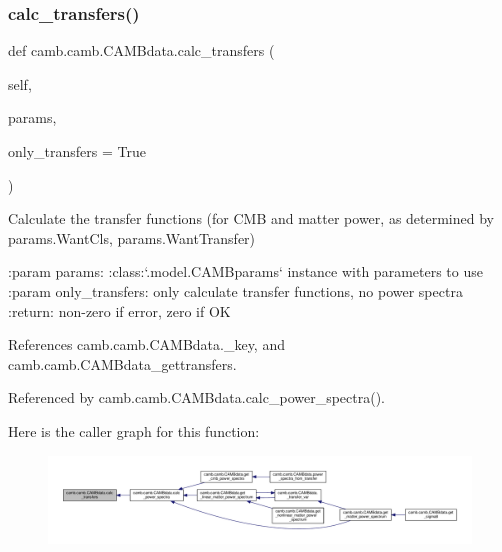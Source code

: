 \subsubsection{\texorpdfstring{calc\+\_\+transfers()}{calc\_transfers()}}
{\footnotesize\ttfamily def camb.\+camb.\+C\+A\+M\+Bdata.\+calc\+\_\+transfers (\begin{DoxyParamCaption}\item[{}]{self,  }\item[{}]{params,  }\item[{}]{only\+\_\+transfers = {\ttfamily True} }\end{DoxyParamCaption})}

\begin{DoxyVerb}Calculate the transfer functions (for CMB and matter power, as determined by params.WantCls, params.WantTransfer)

:param params: :class:`.model.CAMBparams` instance with parameters to use
:param only_transfers: only calculate transfer functions, no power spectra
:return: non-zero if error, zero if OK
\end{DoxyVerb}
 

References camb.\+camb.\+C\+A\+M\+Bdata.\+\_\+key, and camb.\+camb.\+C\+A\+M\+Bdata\+\_\+gettransfers.



Referenced by camb.\+camb.\+C\+A\+M\+Bdata.\+calc\+\_\+power\+\_\+spectra().

Here is the caller graph for this function\+:
\nopagebreak
\begin{figure}[H]
\begin{center}
\leavevmode
\includegraphics[width=350pt]{classcamb_1_1camb_1_1CAMBdata_ad898126931124aa8b68591e04ca7f8cf_icgraph}
\end{center}
\end{figure}
\mbox{\label{classcamb_1_1camb_1_1CAMBdata_af0ce3f135c3734167c4474b63874f89d}} 
